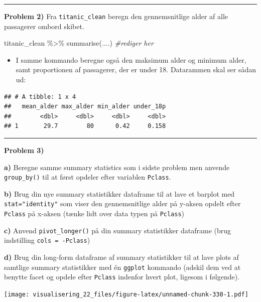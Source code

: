 \documentclass[
]{book}
\newenvironment{Shaded}{\begin{snugshade}}{\end{snugshade}}
\newcommand{\CommentTok}[1]{\textcolor[rgb]{0.56,0.35,0.01}{\textit{#1}}}
\newcommand{\FunctionTok}[1]{\textcolor[rgb]{0.00,0.00,0.00}{#1}}
\newcommand{\NormalTok}[1]{#1}
\newcommand{\SpecialCharTok}[1]{\textcolor[rgb]{0.00,0.00,0.00}{#1}}
\providecommand{\tightlist}{%
  \setlength{\itemsep}{0pt}\setlength{\parskip}{0pt}}
\begin{document}
\begin{center}\rule{0.5\linewidth}{0.5pt}\end{center}

\textbf{Problem 2)} Fra \texttt{titanic\_clean} beregn den gennemsnitlige alder af alle passagerer ombord skibet.

\begin{Shaded}
\begin{Highlighting}[]
\NormalTok{titanic\_clean }\SpecialCharTok{\%\textgreater{}\%}
    \FunctionTok{summarise}\NormalTok{(....) }\CommentTok{\#rediger her}
\end{Highlighting}
\end{Shaded}

\begin{itemize}
\tightlist
\item
  I samme kommando beregne også den maksimum alder og minimum alder, samt proportionen af passagerer, der er under 18. Datarammen skal ser sådan ud:
\end{itemize}

\begin{verbatim}
## # A tibble: 1 x 4
##   mean_alder max_alder min_alder under_18p
##        <dbl>     <dbl>     <dbl>     <dbl>
## 1       29.7        80      0.42     0.158
\end{verbatim}

\begin{center}\rule{0.5\linewidth}{0.5pt}\end{center}

\textbf{Problem 3)}

\textbf{a)} Beregne samme summary statistics som i sidste problem men anvende \texttt{group\_by()} til at først opdeler efter variablen \texttt{Pclass}.

\textbf{b)} Brug din nye summary statistikker dataframe til at lave et barplot med \texttt{stat="identity"} som viser den gennemsnitlige alder på y-aksen opdelt efter \texttt{Pclass} på x-aksen (tænke lidt over data typen på \texttt{Pclass})

\textbf{c)} Anvend \texttt{pivot\_longer()} på din summary statistikker dataframe (brug indstilling \texttt{cols\ =\ -Pclass})

\textbf{d)} Brug din long-form dataframe af summary statistikker til at lave plots af samtlige summary statistikker med én \texttt{ggplot} kommando (adskil dem ved at benytte facet og opdele efter \texttt{Pclass} indenfor hvert plot, ligesom i følgende).

\texttt{[image: visualisering\_22\_files/figure-latex/unnamed-chunk-330-1.pdf]}
\end{document}
